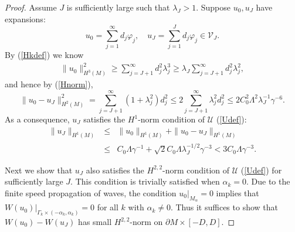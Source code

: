 \documentclass[11pt,letterpaper]{amsart}
\numberwithin{equation}{section}
\theoremstyle{definition}
\theoremstyle{plain}
\theoremstyle{definition}
\theoremstyle{plain}
\theoremstyle{definition}
\theoremstyle{plain}
\begin{document}
\begin{proof}
Assume $J$ is sufficiently large such that $\lambda_J>1$. Suppose $u_0,u_J$ have expansions:
$$u_0=\sum_{j=1}^{\infty} d_j \varphi_j, \quad u_{J}=\sum_{j=1}^{J} d_j \varphi_j \in \mathcal{V}_{J}. $$
By (\ref{Hkdef}) we know
\begin{eqnarray}\label{H3}
\|u_0\|_{H^3(M)}^2 \geqslant \sum_{j=J+1}^{\infty} d_j^2 \lambda_j^3 \geqslant \lambda_{J} \sum_{j=J+1}^{\infty} d_j^2 \lambda_j^2,
\end{eqnarray}
and hence by (\ref{Hnorm}),
\begin{equation}\label{H2error}
\|u_0-u_{J}\|_{H^2(M)}^2 =  \sum_{j=J+1}^{\infty} (1+\lambda_j^2) d_j^2 \leqslant 2\sum_{j=J+1}^{\infty} \lambda_j^2 d_j^2 \leqslant 2C_0^2 \Lambda^2 \lambda_{J}^{-1}\gamma^{-6}.
\end{equation}
As a consequence, $u_{J}$ satisfies the $H^1$-norm condition of $\mathcal{U}$ (\ref{Udef}):
\begin{eqnarray*}
\|u_{J}\|_{H^1(M)} &\leqslant& \|u_0\|_{H^1(M)}+\|u_0-u_{J}\|_{H^1(M)} \\
&\leqslant& C_0\Lambda \gamma^{-1}+\sqrt{2}C_0 \Lambda \lambda_{J}^{-1/2} \gamma^{-3} < 3C_0\Lambda \gamma^{-3}.
\end{eqnarray*}

Next we show that $u_{J}$ also satisfies the $H^{2,2}$-norm condition of $\mathcal{U}$ (\ref{Udef}) for sufficiently large $J$. This condition is trivially satisfied when $\alpha_k=0$.
Due to the finite speed propagation of waves, the condition $u_0 |_{M_{\alpha}}=0$ implies that $W(u_0)|_{\Gamma_k\times (-\alpha_k,\alpha_k)}=0$ for all $k$ with $\alpha_k\neq 0$. Thus it suffices to show that $W(u_0)-W(u_{J})$ has small $H^{2,2}$-norm on $\partial M\times [-D,D]$. 


\end{proof}
\end{document}
